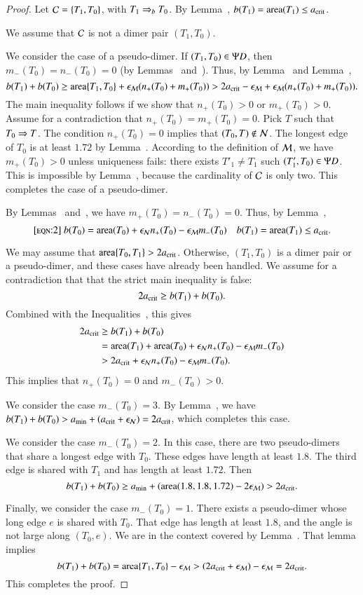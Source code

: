 \begin{proof}  
  Let $\mathcal C = \{T_1,T_0\}$, with $T_1\Rightarrow_{b} T_0$. By
  Lemma~, $b(T_1)={\operatorname{area}}(T_1)\le a_\text{crit}$.

  We assume that $\mathcal C$ is not a dimer pair $(T_1,T_0)$.

  We consider the case of a pseudo-dimer.  If $(T_1,T_0)\in\Psi D$, then
  $m_-(T_0)=n_-(T_0)=0$ (by Lemmas~
  and~).  Thus, by Lemma~ and
  Lemma~,
\[
b(T_1)+b(T_0) 
\ge {\operatorname{area}}\{T_1,T_0\} + \epsilon_{\mathcal M} (n_+(T_0) + m_+(T_0)) 
> 2a_\text{crit} - \epsilon_{\mathcal M}  + \epsilon_{\mathcal M} (n_+(T_0)+m_+(T_0)).
\]
The main inequality follows if we show that $n_+(T_0)>0$ or
$m_+(T_0)>0$.  Assume for a contradiction that $n_+(T_0)=m_+(T_0)=0$.
Pick $T$ such that $T_0\Rightarrow T$.  The condition $n_+(T_0)=0$ implies
that $(T_0,T)\not\in\mathcal N$.  The longest edge of $T_0$ is at least $1.72$
by Lemma~.  According to the definition of $\mathcal M$, we
have $m_+(T_0)>0$ unless uniqueness fails: there exists $T'_1\ne T_1$
such $(T'_1,T_0)\in\Psi D$.  This is impossible by
Lemma~, because the cardinality of $\mathcal C$ is only two.
This completes the case of a pseudo-dimer.

By Lemmas~ and~, we have
$m_+(T_0)=n_-(T_0)=0$.  Thus,
by Lemma~,
\begin{equation}\libel{eqn:2}
b(T_0) = \area(T_0) + \epsN n_+(T_0) - \epsM m_-(T_0)
\quad b(T_1) = \area(T_1) \le \acrit.
\end{equation}

We may assume that ${\operatorname{area}}\{T_0,T_1\}> 2a_\text{crit}$.  Otherwise,
$(T_1,T_0)$ is a dimer pair or a pseudo-dimer, and these cases have
already been handled.  We assume for a contradiction that that the
strict main inequality is false:
\[
2a_\text{crit} \ge b(T_1) + b(T_0).
\]
Combined with the Inequalities~,
this gives
\begin{align*}
2a_\text{crit} &\ge b(T_1) + b(T_0) \\
&= {\operatorname{area}}(T_1) + {\operatorname{area}}(T_0) +\epsilon_{\mathcal N} n_+(T_0) - \epsilon_{\mathcal M} m_-(T_0)\\
&> 2a_\text{crit} + \epsilon_{\mathcal N} n_+(T_0) - \epsilon_{\mathcal M} m_-(T_0).
\end{align*}
This implies that $n_+(T_0)=0$ and $m_-(T_0) > 0$.

We consider the case $m_-(T_0)= 3$.  By Lemma~, we have
$b(T_1) + b(T_0) > a_\text{min} + (a_\text{crit} + \epsilon_{\mathcal N}) = 2a_\text{crit}$, which completes
this case.

We consider the case $m_-(T_0)=2$.  In this case, there are two
pseudo-dimers that share a longest edge with $T_0$.  These edges have
length at least $1.8$. The third edge is shared with $T_1$ and has
length at least $1.72$.  Then
\[
b(T_1)+b(T_0) 
\ge a_\text{min} + ({\operatorname{area}} (1.8,1.8,1.72) - 2\epsilon_{\mathcal M}) > 2a_\text{crit}.
\]

Finally, we consider the case $m_-(T_0)=1$.  There exists a
pseudo-dimer whose long edge $e$ is shared with $T_0$.  That edge has
length at least $1.8$, and the angle is not large along $(T_0,e)$. We
are in the context covered by Lemma~.  That lemma
implies
\[
b(T_1) + b(T_0) 
= {\operatorname{area}}\{T_1,T_0\} - \epsilon_{\mathcal M} 
> (2a_\text{crit}  +\epsilon_{\mathcal M}) - \epsilon_{\mathcal M} = 2a_\text{crit}.
\]
This completes the proof.
\end{proof}

